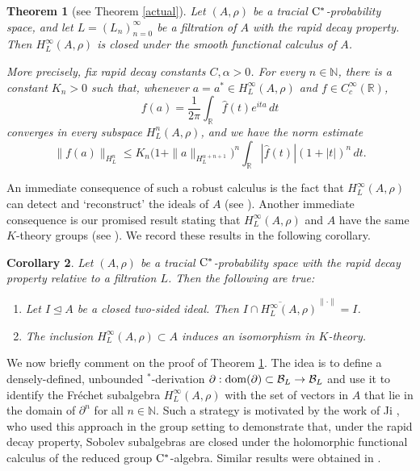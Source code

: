 \documentclass[11pt]{article}
\newtheorem{thm}{Theorem}[section]
\newtheorem{cor}[thm]{Corollary}
\theoremstyle{definition}
\theoremstyle{remark}
\numberwithin{equation}{section}
\numberwithin{equation}{section}
\def\N{\mathbb{N}}
\numberwithin{equation}{section}
\begin{document}
\begin{thm}[see Theorem \ref{actual}]\label{mainthm}
        Let $(A,\rho)$ be a tracial ${\rm C}^*$-probability space, and let
$L=(L_n)_{n=0}^\infty$ be a filtration of $A$ with the rapid decay property.
Then $H_L^\infty(A,\rho)$ is closed under the smooth functional calculus of
$A$.

More precisely, fix rapid decay constants $C,\alpha>0$.  For every
$n\in\mathbb N$, there is a constant $K_n>0$ such that, whenever
$a=a^*\in H_L^\infty(A,\rho)$ and $f\in C_c^\infty(\mathbb R)$,
\begin{equation*}
 f(a)=\frac{1}{2\pi}\int_{\mathbb R}\widehat f(t)e^{ita}\,dt
\end{equation*}
converges in every subspace $H_L^n(A,\rho)$, and we have the norm estimate
\begin{equation*}
 \|f(a)\|_{H_L^n}\leq K_n\bigl(1+\|a\|_{H_L^{\alpha+n+1}}\bigr)^n \int_{\mathbb R}|\widehat f(t)|(1+|t|)^n\,dt.
\end{equation*}
\end{thm}

An immediate consequence of such a robust calculus is the fact that $H_L^{\infty}(A,\rho)$ can detect and `reconstruct' the ideals of $A$ (see \cite{KiSh94}). Another immediate consequence is our promised result stating that $H_L^{\infty}(A,\rho)$ and $A$ have the same $K$-theory groups (see \cite{Ph91,Sc92}). We record these results in the following corollary.

\begin{cor}
    Let $(A,\rho)$ be a tracial ${\rm C}^*$-probability space with the rapid decay property relative to a filtration $L$. Then the following are true:
    \begin{enumerate}
        \item[(i)] Let $I\unlhd A$ be a closed two-sided ideal. Then $\overline{I\cap H_L^{\infty}(A,\rho) }^{\|\cdot\|}=I$.  
        \item[(ii)] The inclusion $H_L^{\infty}(A,\rho)\subset A$ induces an isomorphism in $K$-theory.
    \end{enumerate}
\end{cor}

We now briefly comment on the proof of Theorem \ref{mainthm}. The idea is to define a densely-defined, unbounded $^*$-derivation $\partial:{\rm dom}(\partial)\subset \mathcal B_L\to \mathcal B_L$ and use it to identify the Fr\'echet subalgebra $H_L^{\infty}(A,\rho)$ with the set of vectors in $A$ that lie in the domain of $\partial^n$ for all $n\in\N$. Such a strategy is motivated by the work of Ji \cite{Ji92}, who used this approach in the group setting to demonstrate that, under the rapid decay property, Sobolev subalgebras are closed under the holomorphic functional calculus of the reduced group ${\rm C}^*$-algebra. Similar results were obtained in \cite{LiYu17,AOP25,ChWa26}.
\end{document}
